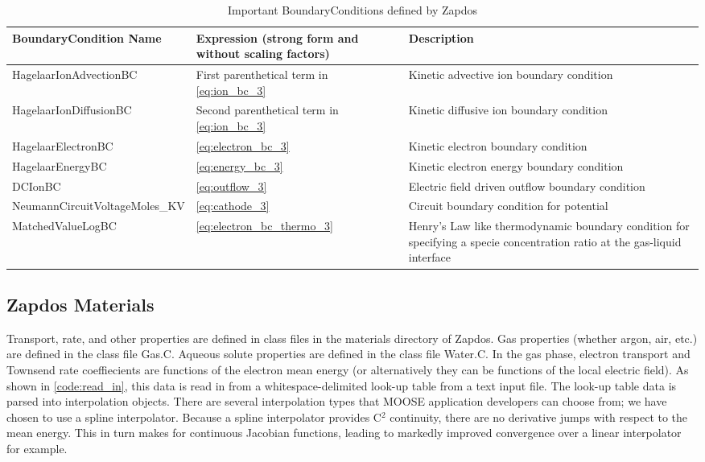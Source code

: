 \begin{ThreePartTable}

  \begin{TableNotes}
  \end{TableNotes}

  \begin{longtable}{>{\centering}m{2in}| >{\centering}m{2in}| >{\raggedright\arraybackslash}m{2in}}
    \textbf{BoundaryCondition Name} & \textbf{Expression (strong form and without scaling factors)} & \textbf{Description}\\\hline\hline
    \endhead
    \caption{Important BoundaryConditions defined by Zapdos}
    \endfoot
    \caption{Important BoundaryConditions defined by Zapdos}
    \label{tab:bcs}
    \endlastfoot

    HagelaarIonAdvectionBC & First parenthetical term in \cref{eq:ion_bc_3} & Kinetic advective ion boundary condition\\\hline
    HagelaarIonDiffusionBC & Second parenthetical term in \cref{eq:ion_bc_3} & Kinetic diffusive ion boundary condition\\\hline
    HagelaarElectronBC & \cref{eq:electron_bc_3} & Kinetic electron boundary condition\\\hline
    HagelaarEnergyBC & \cref{eq:energy_bc_3} & Kinetic electron energy boundary condition\\\hline
    DCIonBC & \cref{eq:outflow_3} & Electric field driven outflow boundary condition\\\hline
    NeumannCircuitVoltageMoles\_KV & \cref{eq:cathode_3} & Circuit boundary condition for potential\\\hline
    MatchedValueLogBC & \cref{eq:electron_bc_thermo_3} & Henry's Law like thermodynamic boundary condition for specifying a specie concentration ratio at the gas-liquid interface\\\hline
  \end{longtable}
\end{ThreePartTable}

\subsection{Zapdos Materials}
\label{sec:zap_materials}

Transport, rate, and other properties are defined in class files in the materials directory of Zapdos. Gas properties (whether argon, air, etc.) are defined in the class file Gas.C. Aqueous solute properties are defined in the class file Water.C. In the gas phase, electron transport and Townsend rate coeffiecients are functions of the electron mean energy (or alternatively they can be functions of the local electric field). As shown in \cref{code:read_in}, this data is read in from a whitespace-delimited look-up table from a text input file. The look-up table data is parsed into interpolation objects. There are several interpolation types that MOOSE application developers can choose from; we have chosen to use a spline interpolator. Because a spline interpolator provides C$^2$ continuity, there are no derivative jumps with respect to the mean energy. This in turn makes for continuous Jacobian functions, leading to markedly improved convergence over a linear interpolator for example.

